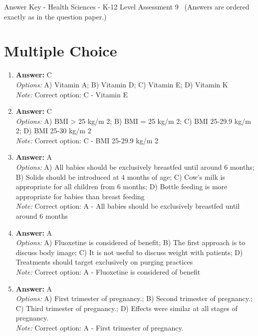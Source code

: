 \documentclass[12pt]{article}
\begin{document}
\begin{center}
Answer Key - Health Sciences - K-12 Level Assessment 9 \
\small (Answers are ordered exactly as in the question paper.)
\end{center}

\section*{Multiple Choice}
\begin{enumerate}[label=\arabic*.]
\item \textbf{Answer:} C
\\ \textit{Options:} A) Vitamin A; B) Vitamin D; C) Vitamin E; D) Vitamin K
\\ \textit{Note:} Correct option: C - Vitamin E
\item \textbf{Answer:} C
\\ \textit{Options:} A) BMI \textgreater{} 25 kg/m 2; B) BMI = 25 kg/m 2; C) BMI 25-29.9 kg/m 2; D) BMI 25-30 kg/m 2
\\ \textit{Note:} Correct option: C - BMI 25-29.9 kg/m 2
\item \textbf{Answer:} A
\\ \textit{Options:} A) All babies should be exclusively breastfed until around 6 months; B) Solids should be introduced at 4 months of age; C) Cow's milk is appropriate for all children from 6 months; D) Bottle feeding is more appropriate for babies than breast feeding
\\ \textit{Note:} Correct option: A - All babies should be exclusively breastfed until around 6 months
\item \textbf{Answer:} A
\\ \textit{Options:} A) Fluoxetine is considered of benefit; B) The first approach is to discuss body image; C) It is not useful to discuss weight with patients; D) Treatments should target exclusively on purging practices
\\ \textit{Note:} Correct option: A - Fluoxetine is considered of benefit
\item \textbf{Answer:} A
\\ \textit{Options:} A) First trimester of pregnancy.; B) Second trimester of pregnancy.; C) Third trimester of pregnancy.; D) Effects were similar at all stages of pregnancy.
\\ \textit{Note:} Correct option: A - First trimester of pregnancy.
\end{enumerate}
\end{document}
